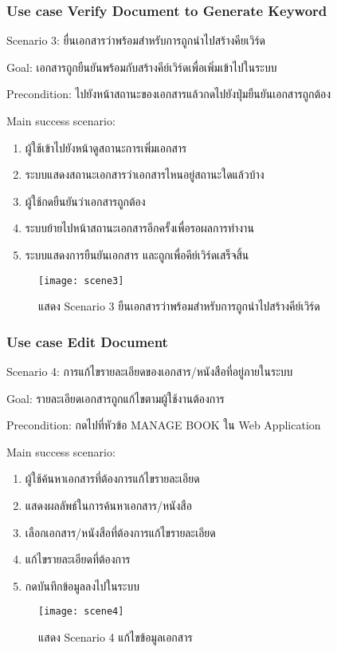 \subsubsection{Use case Verify Document to Generate Keyword}

Scenario 3: ยื่นเอกสารว่าพร้อมสำหรับการถูกนำไปสร้างคียเวิร์ด

Goal: เอกสารถูกยืนยันพร้อมกับสร้างคีย์เวิร์ดเพื่อเพิ่มเข้าไปในระบบ

Precondition: ไปยังหน้าสถานะของเอกสารแล้วกดไปยังปุ่มยืนยันเอกสารถูกต้อง

Main success scenario:

\begin{enumerate}
    \item ผู้ใช้เข้าไปยังหน้าดูสถานะการเพิ่มเอกสาร
    \item ระบบแสดงสถานะเอกสารว่าเอกสารไหนอยู่สถานะใดแล้วบ้าง
    \item ผู้ใช้กดยืนยันว่าเอกสารถูกต้อง
    \item ระบบย้ายไปหน้าสถานะเอกสารอีกครั้งเพื่อรอผลการทำงาน
    \item ระบบแสดงการยืนยันเอกสาร และถูกเพื่อคีย์เวิร์ดเสร็จสิ้น
\end{enumerate}
\begin{figure}[H]
    \centering
    \texttt{[image: scene3]}
    \caption{แสดง Scenario 3 ยืนเอกสารว่าพร้อมสำหรับการถูกนำไปสร้างคีย์เวิร์ด}\label{fig:scene3}
\end{figure}

\subsubsection{Use case Edit Document}

Scenario 4: การแก้ไขรายละเอียดของเอกสาร/หนังสือที่อยู่ภายในระบบ

Goal: รายละเอียดเอกสารถูกแก้ไขตามผู้ใช้งานต้องการ

Precondition: กดไปที่หัวข้อ MANAGE BOOK ใน Web Application

Main success scenario:

\begin{enumerate}
    \item ผู้ใช้ค้นหาเอกสารที่ต้องการแก้ไขรายละเอียด
    \item แสดงผลลัพธ์ในการค้นหาเอกสาร/หนังสือ
    \item เลือกเอกสาร/หนังสือที่ต้องการแก้ไขรายละเอียด
    \item แก้ไขรายละเอียดที่ต้องการ
    \item กดบันทึกข้อมูลลงไปในระบบ
\end{enumerate}
\begin{figure}[H]
    \centering
    \texttt{[image: scene4]}
    \caption{แสดง Scenario 4 แก้ไขข้อมูลเอกสาร}\label{fig:scene4}
\end{figure}

